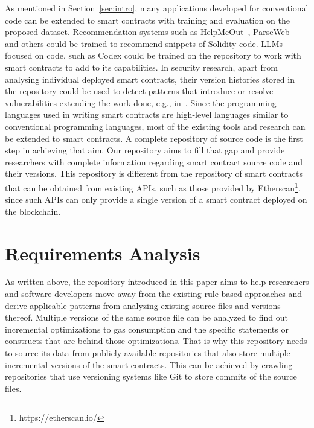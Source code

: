 \documentclass[10pt,conference]{IEEEtran}
\begin{document}
	As mentioned in Section~\ref{sec:intro}, many applications developed for conventional code can be extended to smart contracts with training and evaluation on the proposed dataset.  Recommendation systems such as HelpMeOut~\cite{helpmeout}, ParseWeb~\cite{parseweb} and others could be trained to recommend snippets of Solidity code. LLMs focused on code, such as Codex \cite{codex} could be trained on the repository to work with smart contracts to add to its capabilities. In security research, apart from analysing individual deployed smart contracts, their version histories stored in the repository could be used to detect patterns that introduce or resolve vulnerabilities extending the work done, e.g., in~\cite{securitydataset}. Since the programming languages used in writing smart contracts are high-level languages similar to conventional programming languages, most of the existing tools and research can be extended to smart contracts. A complete repository of source code is the first step in achieving that aim. Our repository aims to fill that gap and provide researchers with complete information regarding smart contract source code and their versions. This repository is different from the repository of smart contracts that can be obtained from existing APIs, such as those provided by Etherscan\footnote{https://etherscan.io/}, since such APIs can only provide a single version of a smart contract deployed on the blockchain.
	
	
	
	\section{Requirements Analysis}
	\label{sec:requirements}
	As written above, the repository introduced in this paper aims to help researchers and software developers move away from the existing rule-based approaches and derive applicable patterns from analyzing existing source files and versions thereof. Multiple versions of the same source file can be analyzed to find out incremental optimizations to gas consumption and the specific statements or constructs that are behind those optimizations. That is why this repository needs to source its data from publicly available repositories that also store multiple incremental versions of the smart contracts. This can be achieved by crawling repositories that use versioning systems like Git to store commits of the source files.  
	
\end{document}
